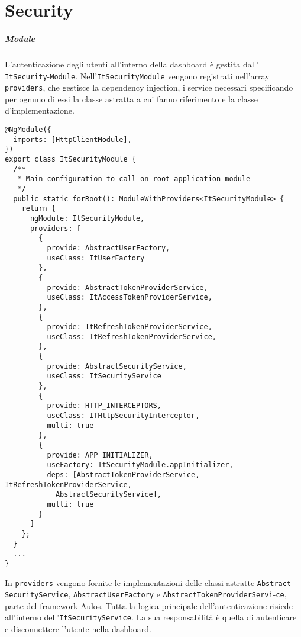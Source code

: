 \chapter{Security}
\label{chap:security}

\paragraph{Module}
L'autenticazione degli utenti all'interno della dashboard è gestita dall' \verb|ItSecurity|-\verb|Module|. Nell'\verb|ItSecurityModule| vengono registrati nell'array \verb|providers|, che gestisce la dependency injection, i service necessari specificando per ognuno di essi la classe astratta a cui fanno riferimento e la classe d'implementazione.
\begin{lstlisting}[caption={Injection dei service nell'ItSecurityModule}, style=javaScriptCode]
@NgModule({
  imports: [HttpClientModule],
})
export class ItSecurityModule {
  /**
   * Main configuration to call on root application module
   */
  public static forRoot(): ModuleWithProviders<ItSecurityModule> {
    return {
      ngModule: ItSecurityModule,
      providers: [
        {
          provide: AbstractUserFactory,
          useClass: ItUserFactory
        },
        {
          provide: AbstractTokenProviderService,
          useClass: ItAccessTokenProviderService,
        },
        {
          provide: ItRefreshTokenProviderService,
          useClass: ItRefreshTokenProviderService,
        },
        {
          provide: AbstractSecurityService,
          useClass: ItSecurityService
        },
        {
          provide: HTTP_INTERCEPTORS,
          useClass: ITHttpSecurityInterceptor,
          multi: true
        },
        {
          provide: APP_INITIALIZER,
          useFactory: ItSecurityModule.appInitializer,
          deps: [AbstractTokenProviderService, ItRefreshTokenProviderService, 
            AbstractSecurityService],
          multi: true
        }
      ]
    };
  }
  ...
}
\end{lstlisting}
In \verb|providers| vengono fornite le implementazioni delle classi astratte
\verb|Abstract|-\verb|SecurityService|, \verb|AbstractUserFactory| e \verb|AbstractTokenProviderServi|-\verb|ce|, parte del framework Aulos.
Tutta la logica principale dell'autenticazione risiede all'interno dell'\verb|ItSecurityService|. La sua responsabilità è quella di autenticare e disconnettere l'utente nella dashboard. \\
